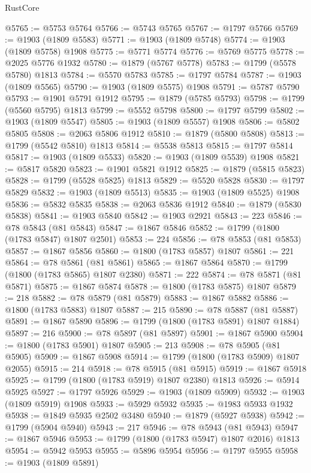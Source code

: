 \begin{lexlean}{RustCore}
\begin{coremodule}
@5765 := @5753 @5764
@5766 := @5743 @5765
@5767 := @1797 @5766
@5769 := @1903 (@1809 @5583)
@5771 := @1903 (@1809 @5748)
@5774 := @1903 (@1809 @5758) @1908
@5775 := @5771 @5774
@5776 := @5769 @5775
@5778 := @2025 @5776 @1932
@5780 := @1879 (@5767 @5778)
@5783 := @1799 (@5578 @5780) @1813
@5784 := @5570 @5783
@5785 := @1797 @5784
@5787 := @1903 (@1809 @5565)
@5790 := @1903 (@1809 @5575) @1908
@5791 := @5787 @5790
@5793 := @1901 @5791 @1912
@5795 := @1879 (@5785 @5793)
@5798 := @1799 (@5560 @5795) @1813
@5799 := @5552 @5798
@5800 := @1797 @5799
@5802 := @1903 (@1809 @5547)
@5805 := @1903 (@1809 @5557) @1908
@5806 := @5802 @5805
@5808 := @2063 @5806 @1912
@5810 := @1879 (@5800 @5808)
@5813 := @1799 (@5542 @5810) @1813
@5814 := @5538 @5813
@5815 := @1797 @5814
@5817 := @1903 (@1809 @5533)
@5820 := @1903 (@1809 @5539) @1908
@5821 := @5817 @5820
@5823 := @1901 @5821 @1912
@5825 := @1879 (@5815 @5823)
@5828 := @1799 (@5528 @5825) @1813
@5829 := @5520 @5828
@5830 := @1797 @5829
@5832 := @1903 (@1809 @5513)
@5835 := @1903 (@1809 @5525) @1908
@5836 := @5832 @5835
@5838 := @2063 @5836 @1912
@5840 := @1879 (@5830 @5838)
@5841 := @1903 @5840
@5842 := @1903 @2921
@5843 := 223
@5846 := @78 @5843 (@81 @5843)
@5847 := @1867 @5846
@5852 := @1799 (@1800 (@1783 @5847) @1807 @2501)
@5853 := 224
@5856 := @78 @5853 (@81 @5853)
@5857 := @1867 @5856
@5860 := @1800 (@1783 @5857) @1807
@5861 := 221
@5864 := @78 @5861 (@81 @5861)
@5865 := @1867 @5864
@5870 := @1799 (@1800 (@1783 @5865) @1807 @2380)
@5871 := 222
@5874 := @78 @5871 (@81 @5871)
@5875 := @1867 @5874
@5878 := @1800 (@1783 @5875) @1807
@5879 := 218
@5882 := @78 @5879 (@81 @5879)
@5883 := @1867 @5882
@5886 := @1800 (@1783 @5883) @1807
@5887 := 215
@5890 := @78 @5887 (@81 @5887)
@5891 := @1867 @5890
@5896 := @1799 (@1800 (@1783 @5891) @1807 @1884)
@5897 := 216
@5900 := @78 @5897 (@81 @5897)
@5901 := @1867 @5900
@5904 := @1800 (@1783 @5901) @1807
@5905 := 213
@5908 := @78 @5905 (@81 @5905)
@5909 := @1867 @5908
@5914 := @1799 (@1800 (@1783 @5909) @1807 @2055)
@5915 := 214
@5918 := @78 @5915 (@81 @5915)
@5919 := @1867 @5918
@5925 := @1799 (@1800 (@1783 @5919) @1807 @2380) @1813
@5926 := @5914 @5925
@5927 := @1797 @5926
@5929 := @1903 (@1809 @5909)
@5932 := @1903 (@1809 @5919) @1908
@5933 := @5929 @5932
@5935 := @1983 @5933 @1932
@5938 := @1849 @5935 @2502 @3480
@5940 := @1879 (@5927 @5938)
@5942 := @1799 (@5904 @5940)
@5943 := 217
@5946 := @78 @5943 (@81 @5943)
@5947 := @1867 @5946
@5953 := @1799 (@1800 (@1783 @5947) @1807 @2016) @1813
@5954 := @5942 @5953
@5955 := @5896 @5954
@5956 := @1797 @5955
@5958 := @1903 (@1809 @5891)

\end{coremodule}
\end{lexlean}
